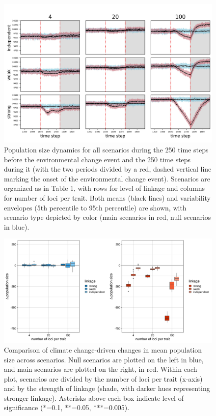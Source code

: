 \documentclass[9pt,twocolumn,twoside,lineno]{pnas-new}
\begin{document}
\begin{figure}
\centering
\includegraphics[width=11.4cm]{Nt_over_time.jpg}
\caption{Population size dynamics for all scenarios during the 250 time steps before the environmental change event and the 250 time steps during it (with the two periods divided by a red, dashed vertical line marking the onset of the environmental change event). Scenarios are organized as in Table 1, with rows for level of linkage and columns for number of loci per trait. Both means (black lines) and variability envelopes (5th percentile to 95th percentile) are shown, with scenario type depicted by color (main scenarios in red, null scenarios in blue).}
\label{fig:Nt_over_time}
\end{figure}

\begin{figure}
\centering
\includegraphics[width=11.4cm]{Nt_boxplot.jpg}
\caption{Comparison of climate change-driven changes in mean population size across scenarios. Null scenarios are plotted on the left in blue, and main scenarios are plotted on the right, in red. Within each plot, scenarios are divided by the number of loci per trait (x-axis) and by the strength of linkage (shade, with darker hues representing stronger linkage). Asterisks above each box indicate level of significance (*=0.1, **=0.05, ***=0.005).}
\label{fig:Nt_boxplot}
\end{figure}
\end{document}
